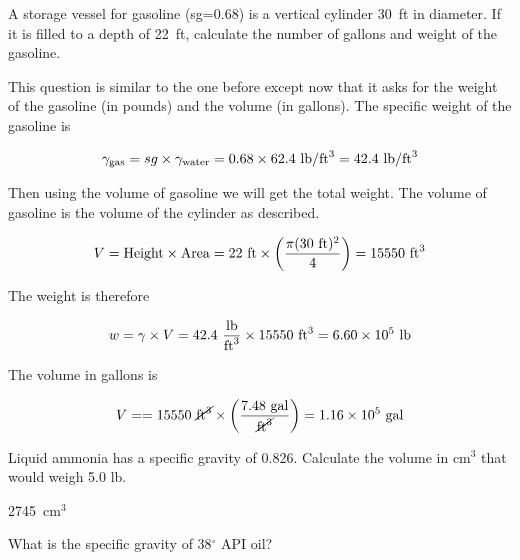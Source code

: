 \documentclass[multi,preview,varwidth=false,border=5,12pt]{standalone}
\begin{document}
\begin{question}
A storage vessel for gasoline (sg=0.68) is a vertical cylinder 30~ft in diameter.  If it is filled to a depth of 22~ft, calculate the number of gallons and weight of the gasoline.

\begin{solution}
  This question is similar to the one before except now that it asks for the weight of the gasoline (in pounds) and the volume (in gallons).  The specific weight of the gasoline is

  \begin{align*}
    \gamma_{\rm gas}=sg\times \gamma_{\rm water}=0.68\times 62.4~\mathrm{lb}/\mathrm{ft}^3=42.4~\mathrm{lb}/\mathrm{ft}^3
  \end{align*}

  Then using the volume of gasoline we will get the total weight.  The volume of gasoline is the volume of the cylinder as described.

  \begin{align*}
      V={\rm Height}\times {\rm Area}=22~\mathrm{ft}\times \left(\frac{\pi (30~\mathrm{ft})^2}{4}\right)=15550~\mathrm{ft}^3
  \end{align*}

  The weight is therefore

  \begin{align*}
      w=\gamma\times V=42.4~\frac{\mathrm{lb}}{\mathrm{ft}^3}\times 15550~\mathrm{ft}^3 = 6.60\times 10^5~\mathrm{lb}
  \end{align*}

  The volume in gallons is

    \begin{align*}
      V==15550~\cancel{\mathrm{ft}^3}\times\left(\frac{7.48~\mathrm{gal}}{\cancel{\mathrm{ft}^3}}\right)=1.16\times 10^5~\mathrm{gal}
  \end{align*}

\end{solution}

\end{question}


\begin{question}
Liquid ammonia has a specific gravity of 0.826.  Calculate the volume in cm$^3$  that would weigh 5.0 lb.

\begin{solution}
 2745~cm$^3$
\end{solution}

\end{question}

\begin{question}
What is the specific gravity of 38$^\circ$ API oil?

\end{question}
\end{document}
